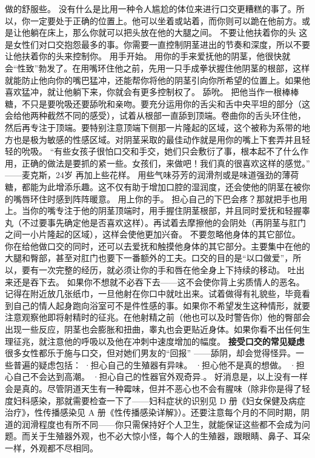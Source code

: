 \documentclass[12pt,UTF8,openany]{ctexbook}
\begin{document}
做的舒服些。
没有什么是比用一种令人尴尬的体位来进行口交更糟糕的事了。所以，你一定要处于正确的位置上。他可以坐着或站着，而你则可以跪在他前方。或是让他躺在床上，那么你就可以把头放在他的大腿之间。
不要让他扶着你的头
这是女性们对口交抱怨最多的事。你需要一直控制阴茎进出的节奏和深度，所以不要让他扶着你的头来控制你。
用手开始。
用你的手来爱抚他的阴茎，他很快就会“性致”勃发了。在用嘴环住他之前，先用一只手成拳状握住他阴茎的根部，这样就能防止他向你的嘴巴猛冲，还能帮你将他的阴茎引向你所希望的位置上。如果他喜欢猛冲，就让他躺下来，你就会有更多控制权了。
舔吮。
把他当作一根棒棒糖，不只是要吮吸还要舔吮和亲吻。要充分运用你的舌尖和舌中央平坦的部分（这会给他两种截然不同的感受），试着从根部一直舔到顶端。卷曲你的舌头环住他，然后再专注于顶端。要特别注意顶端下侧那一片隆起的区域，这个被称为系带的地方也是极为敏感的性感区域。对阴茎采取的最佳动作就是用你的嘴上下套弄并且轻轻的吮吸。
“有些女孩子很怕口交和手交，她们只会敷衍了事，根本起不了什么作用，正确的做法是要抓的紧一些。女孩们，来做吧！我们真的很喜欢这样的感觉。”
——麦克斯，24岁
再加上些花样。
用些气味芬芳的润滑剂或是味道强劲的薄荷糖，都能为此增添乐趣。这不仅有助于增加口腔的湿润度，还会使他的阴茎在被你的嘴唇环住时感到阵阵暖意。
用上你的手。
担心自己的下巴会疼？那就把手也用上。当你的嘴专注于他的阴茎顶端时，用手握住阴茎根部，并且同时爱抚和轻握睾丸（不过要事先确定他是否喜欢这样）。再试着去摩擦他的会阴处（再阴茎与肛门之间一小片隆起的区域），这样会使他更加兴奋。
不要忽略他身体的其它部位。
你在给他做口交的同时，还可以去爱抚和触摸他身体的其它部分。主要集中在他的大腿和臀部，甚至对肛门也要下一番额外的工夫。口交的目的是“以口做爱”，所以，要有一次完整的经历，就必须让你的手和唇在他全身上下持续的移动。
吐出来还是吞下去。
如果你不想就不必吞下去——这不会使你背上劣质情人的恶名。记得在附近放几张纸巾，一旦他射在你口中就吐出来。试着做得有礼貌些，毕竟看到自己的情人起身跑向浴室可不是件性感的事。如果你不希望发生这种情形，就要注意观察他即将射精时的征兆。在他射精之前（他也可以及时警告你）他的臀部会出现一些反应，阴茎也会膨胀和扭曲，睾丸也会更贴近身体。如果你看不出任何生理征兆，就注意他的呼吸以及他在冲刺中速度增加的幅度。
\textbf{接受口交的常见疑虑}
很多女性都乐于施与口交，但对她们男友的“回报” ——舔阴，却会觉得怪异。一些普遍的疑虑包括：
·担心自己的生殖器有异味。
·担心他不是真的想做。
·担心自己不会达到高潮。
·担心自己的性器官外观奇异.。
好消息是，以上没有一样会是真的。尽管阴道天生有一种霉味，但并不恶心也不会有腥味（除非你是得了轻度妇科感染，那就需要检查一下了——妇科症状的识别见 D 册《妇女保健及病症治疗》，性传播感染见 A 册《性传播感染详解》）。还要注意每个月的不同时期，阴道的润滑程度也有所不同——你只需保持好个人卫生，就能保证这些都不会成为问题。而关于生殖器外观，也不必大惊小怪，每个人的生殖器，跟眼睛、鼻子、耳朵一样，外观都不尽相同。
\end{document}
